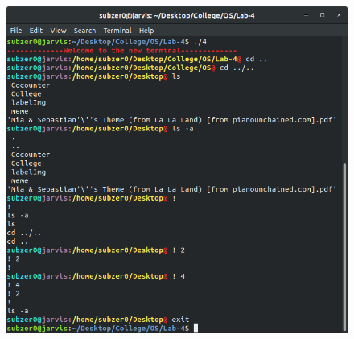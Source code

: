 \documentclass{article}
\begin{document}
\begin{figure}[t]
	\includegraphics[width=\textwidth]{output/4.png}
\end{figure}
\bigskip
\bigskip
\bigskip

\bigskip
\end{document}
